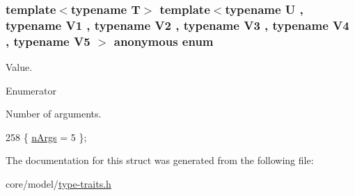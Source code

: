 \subsubsection[{\texorpdfstring{anonymous enum}{anonymous enum}}]{\setlength{\rightskip}{0pt plus 5cm}template$<$typename T$>$ template$<$typename U , typename V1 , typename V2 , typename V3 , typename V4 , typename V5 $>$ anonymous enum}\hypertarget{structTypeTraits_1_1FunctionPtrTraits_3_01U_07_5_08_07V1_00_01V2_00_01V3_00_01V4_00_01V5_08_4_a0cc870669b2dadf02605158758cfdb8c}{}\label{structTypeTraits_1_1FunctionPtrTraits_3_01U_07_5_08_07V1_00_01V2_00_01V3_00_01V4_00_01V5_08_4_a0cc870669b2dadf02605158758cfdb8c}
Value. \begin{Desc}
\item[Enumerator]\par
\begin{description}
\item[{\em 
n\+Args\hypertarget{structTypeTraits_1_1FunctionPtrTraits_3_01U_07_5_08_07V1_00_01V2_00_01V3_00_01V4_00_01V5_08_4_a0cc870669b2dadf02605158758cfdb8ca04c27fa723268137f2689568997c238f}{}\label{structTypeTraits_1_1FunctionPtrTraits_3_01U_07_5_08_07V1_00_01V2_00_01V3_00_01V4_00_01V5_08_4_a0cc870669b2dadf02605158758cfdb8ca04c27fa723268137f2689568997c238f}
}]Number of arguments. \end{description}
\end{Desc}

\begin{DoxyCode}
258 \{ \hyperlink{structTypeTraits_1_1FunctionPtrTraits_3_01U_07_5_08_07V1_00_01V2_00_01V3_00_01V4_00_01V5_08_4_a0cc870669b2dadf02605158758cfdb8ca04c27fa723268137f2689568997c238f}{nArgs} = 5                \};
\end{DoxyCode}


The documentation for this struct was generated from the following file\+:\begin{DoxyCompactItemize}
\item 
core/model/\hyperlink{type-traits_8h}{type-\/traits.\+h}\end{DoxyCompactItemize}
